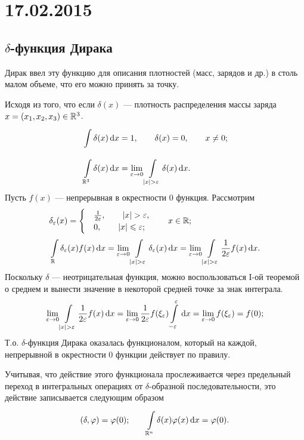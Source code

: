 \section{17.02.2015}
\subsection{$\delta$-функция Дирака}

Дирак ввел эту функцию для описания плотностей (масс, зарядов и др.) в столь малом объеме, что его можно принять за точку.

Исходя из того, что если $\delta(x)$ --- плотность распределения массы заряда $x = (x_1,x_2,x_3) \in \mathbb{R}^3$.
\begin{align*}
    &\integral{}{}{\delta(x)}{x} = 1, \qquad \delta(x) = 0, \qquad x \ne 0; \\
    &\integral{\fieldr^3}{}{\delta(x)}{x} = \lim_{\epsilon \to 0}
    \integral{{\abs{x}>\epsilon}}{}{\delta(x)}{x}.
\end{align*}
Пусть $f(x)$ --- непрерывная в окрестности 0 функция. Рассмотрим
\begin{align*}
	&\delta_{\epsilon}(x) = 
		\begin{cases}
			&\frac{1}{2\epsilon}, \qquad \abs{x} > \epsilon, \\
			&0, \qquad \abs{x} \leq \epsilon;
		\end{cases} \qquad x \in \fieldr; \\
        &\integral{\fieldr}{}{\delta_{\epsilon}(x)f(x)}{x} = \lim_{\epsilon \to
        0} \integral{{\abs{x}>\epsilon}}{}{\delta_{\epsilon}(x)}{x} =
        \lim_{\epsilon \to 0} \integral{{\abs{x}>\epsilon}}{}{\frac{1}{2\epsilon}f(x)}{x}.
\end{align*}
Поскольку $\delta$ --- неотрицательная функция, можно воспользоваться I-ой теоремой о среднем и вынести значение в некоторой средней точке за знак интеграла.
$$
\lim_{\epsilon \to 0} \integral{{\abs{x}>\epsilon}}{}{\frac{1}{2\epsilon}f(x)}{x} = \lim_{\epsilon \to 0} {\frac{1}{2\epsilon} f(\xi_{\epsilon}) \integral{-\epsilon}{\epsilon}{}{x}} = \lim_{\epsilon \to 0} f(\xi_{\epsilon}) = f(0);
$$
Т.о. $\delta$-функция Дирака оказалась функционалом, который на каждой, непрерывной в окрестности 0 функции действует по правилу. 

Учитывая, что действие этого функционала прослеживается через предельный переход в интегральных операциях от $\delta$-образной последовательности, это действие записывается следующим образом
$$
\left( \delta, \varphi \right) = \varphi(0); \qquad \int\limits_{\mathbb{R}^n}^{} \delta(x)\varphi(x) \,\mathrm{d}{x} = \varphi(0).
$$

